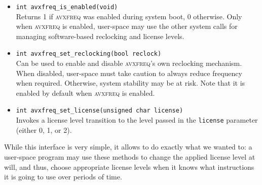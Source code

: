 \begin{itemize}
	\item \texttt{int avxfreq_is_enabled(void)} \\
		Returns 1 if \textsc{avxfreq} was enabled during system boot, 0 otherwise. Only when \textsc{avxfreq} is enabled, user-space may use the other system calls for managing software-based reclocking and license levels.
	\item \texttt{int avxfreq_set_reclocking(bool reclock)} \\
		Can be used to enable and disable \textsc{avxfreq}'s own reclocking mechanism. When disabled, user-space must take caution to always reduce frequency when required. Otherwise, system stability may be at risk. Note that it is enabled by default when \textsc{avxfreq} is enabled.
	\item \texttt{int avxfreq_set_license(unsigned char license)} \\
		Invokes a license level transition to the level passed in the \texttt{license} parameter (either 0, 1, or 2).
\end{itemize}

While this interface is very simple, it allows to do exactly what we wanted to: a user-space program may use these methods to change the applied license level at will, and thus, choose appropriate license levels when it knows what instructions it is going to use over periods of time.